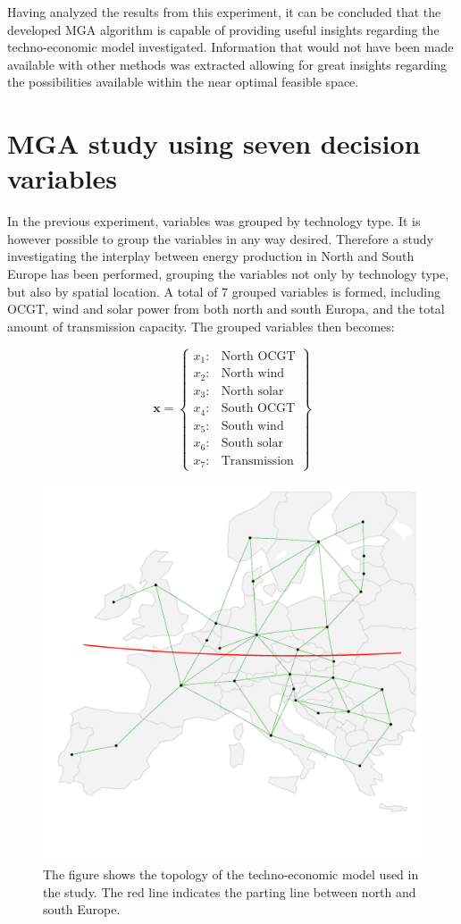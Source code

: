 Having analyzed the results from this experiment, it can be concluded that the developed MGA algorithm is capable of providing useful insights regarding the techno-economic model investigated. Information that would not have been made available with other methods was extracted allowing for great insights regarding the possibilities available within the near optimal feasible space. 

\section{MGA study using seven decision variables}\label{sec:7D}
In the previous experiment, variables was grouped by technology type. It is however possible to group the variables in any way desired. Therefore a study investigating the interplay between energy production in North and South Europe has been performed, grouping the variables not only by technology type, but also by spatial location. A total of 7 grouped variables is formed, including OCGT, wind and solar power from both north and south Europa, and the total amount of transmission capacity. The grouped variables then becomes: 

\begin{equation*}
 \mathbf{x} = 
 \begin{Bmatrix}
 	x_1:& \text{North OCGT} \\
 	x_2:& \text{North wind} \\
 	x_3:& \text{North solar} \\
 	x_4:& \text{South OCGT} \\
 	x_5:& \text{South wind} \\
 	x_6:& \text{South solar} \\
 	x_7:& \text{Transmission} 
 \end{Bmatrix}
\end{equation*}

\begin{figure}[h]\centering
	\includegraphics[width=.7\textwidth,trim={0 3cm 0 0cm},clip]{./Images/7D_study_topology}
	\caption{The figure shows the topology of the techno-economic model used in the study. The red line indicates the parting line between north and south Europe. }
	\label{fig:7d_topology}
\end{figure}

